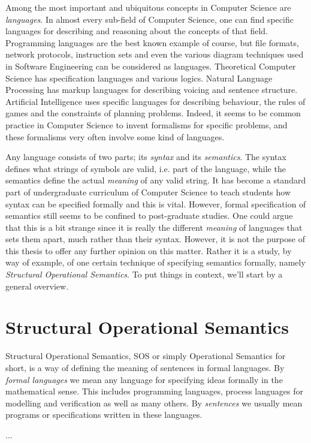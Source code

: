 Among the most important and ubiquitous concepts in Computer Science are \emph{languages}.
In almost every sub-field of Computer Science, one can find specific languages for
describing and reasoning about the concepts of that field. Programming languages
are the best known example of course, but file formats, network protocols,
instruction sets and even the various diagram techniques used in Software
Engineering can be considered as languages. Theoretical Computer Science has
specification languages and various logics. Natural Language Processing has markup
languages for describing voicing and sentence structure. Artificial Intelligence
uses specific languages for describing behaviour, the rules of games and the
constraints of planning problems. Indeed, it seems to be common practice in 
Computer Science to invent formalisms for specific problems, and these formalisms
very often involve some kind of languages.

Any language consists of two parts; its \emph{syntax} and its \emph{semantics}.
The syntax defines what strings of symbols are valid, i.e. part of the language,
while the semantics define the actual \emph{meaning} of any valid string.
It has become a standard part of undergraduate curriculum of Computer Science to
teach students how syntax can be specified formally and this is vital. However,
formal specification of semantics still seems to be confined to post-graduate
studies. One could argue that this is a bit strange since it is really the different
\emph{meaning} of languages that sets them apart, much rather than their syntax.
However, it is not the purpose of this thesis to offer any further opinion on
this matter. Rather it is a study, by way of example, of one certain technique of specifying
semantics formally, namely \emph{Structural Operational Semantics}. To put things
in context, we'll start by a general overview.


\section{Structural Operational Semantics}

Structural Operational Semantics, SOS or simply Operational Semantics for short,
is a way of defining the meaning of sentences in formal languages. By
\emph{formal languages} we mean any language for specifying ideas formally in the mathematical
sense. This includes programming languages, process languages for modelling and
verification as well as many others. By \emph{sentences} we usually mean programs
or specifications written in these languages.

... 